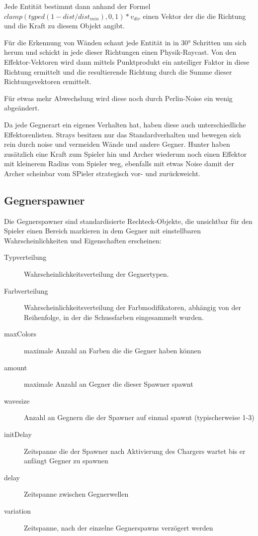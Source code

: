 \documentclass[a4paper,10pt,ngerman,fontsize=12pt]{scrreprt}
\begin{document}
Jede Entität bestimmt dann anhand der Formel $ clamp(typed(1 - dist / dist_{min}), 0, 1) * v_{dir} $ einen Vektor der die die Richtung und die Kraft zu diesem Objekt angibt.

Für die Erkennung von Wänden schaut jede Entität in in 30° Schritten um sich herum und schickt in jede dieser Richtungen einen Physik-Raycast. Von den Effektor-Vektoren wird dann  mittels Punktprodukt ein anteiliger Faktor in diese Richtung ermittelt und die resultierende Richtung durch die Summe dieser Richtungsvektoren ermittelt.

Für etwas mehr Abwechslung wird diese noch durch Perlin-Noise ein wenig abgeändert.

Da jede Gegnerart ein eigenes Verhalten hat, haben diese auch unterschiedliche Effektorenlisten. Strays besitzen nur das Standardverhalten und bewegen sich rein durch noise und vermeiden Wände und andere Gegner. Hunter haben zusätzlich eine Kraft zum Spieler hin und Archer wiederum noch einen Effektor mit kleinerem Radius vom Spieler weg, ebenfalls mit etwas Noise damit der Archer scheinbar vom SPieler strategisch vor- und zurückweicht.



\subsection{Gegnerspawner}
\label{subsect:spawner}

Die Gegnerspawner sind standardisierte Rechteck-Objekte, die unsichtbar für den Spieler einen Bereich markieren in dem Gegner mit einstellbaren Wahrscheinlichkeiten und Eigenschaften erscheinen:

\begin{description}
\item[Typverteilung] Wahrscheinlichkeitsverteilung der Gegnertypen.
\item[Farbverteilung] Wahrscheinlichkeitsverteilung der Farbmodifikatoren, abhängig von der Reihenfolge, in der die Schussfarben eingesammelt wurden.
\item[maxColors] maximale Anzahl an Farben die die Gegner haben können
\item[amount] maximale Anzahl an Gegner die dieser Spawner spawnt
\item[wavesize] Anzahl an Gegnern die der Spawner auf einmal spawnt (typischerweise 1-3)
\item[initDelay] Zeitspanne die der Spawner nach Aktivierung des Chargers wartet bis er anfängt Gegner zu spawnen
\item[delay] Zeitspanne zwischen Gegnerwellen
\item[variation] Zeitspanne, nach der einzelne Gegnerspawns verzögert werden
\end{description}
\end{document}
